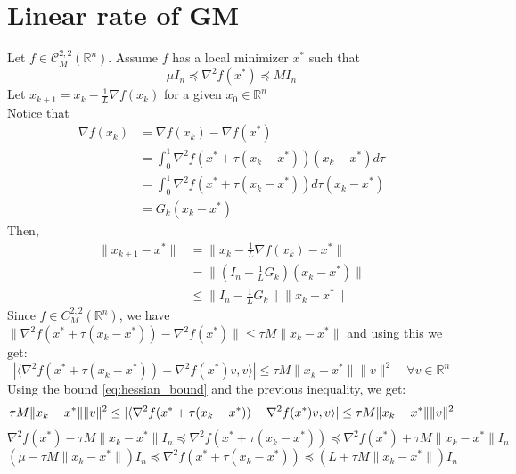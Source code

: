 \documentclass[12pt, openany]{report}
\newcommand{\R}{\mathbb{R}}
\newcommand{\C}{\mathcal{C}}
\theoremstyle{definition}
\begin{document}
\section{Linear rate of GM}
Let $f \in \C_M^{2,2}(\R^n)$. Assume $f$ has a local minimizer $x^*$ such that 
\begin{equation}\label{eq:hessian_bound}
	\mu I_n \preceq \nabla^2 f(x^*) \preceq MI_n
\end{equation}
Let $x_{k+1} = x_k - \frac{1}{L} \nabla f(x_k)$ for a given $x_0 \in \R^n$\\
Notice that
\begin{equation}\label{eq:G_k}
	\begin{aligned}
		\nabla f(x_k) &= \nabla f(x_k) - \nabla f(x^*)\\
		&= \int_{0}^{1} \nabla^2 f(x^* + \tau(x_k-x^*)) (x_k-x^*) d\tau\\
		&= \int_{0}^{1} \nabla^2 f(x^* + \tau(x_k-x^*)) d\tau (x_k-x^*) \\
		&= G_k (x_k-x^*)
	\end{aligned}
\end{equation}
Then,
\begin{equation}
	\begin{aligned}
		\|x_{k+1} - x^*\| &= \|x_k - \frac{1}{L} \nabla f(x_k) - x^*\|\\
		&= \|(I_n-\frac{1}{L}G_k)(x_k-x^*)\|\\
		&\leq \|I_n - \frac{1}{L}G_k\| \|x_k-x^*\|
	\end{aligned}
\end{equation}
Since $f \in C_M^{2,2}(\R^n)$, we have $\|\nabla^2f(x^*+\tau(x_k-x^*))-\nabla^2f(x^*)\| \leq \tau M \|x_k -x^*\|$ and using this we get:
\begin{equation}
	|\langle \nabla^2f(x^*+\tau(x_k-x^*))-\nabla^2f(x^*) v, v\rangle| \leq \tau M \|x_k -x^*\| \|v\|^2 \quad \forall v \in \R^n
\end{equation}
Using the bound \eqref{eq:hessian_bound} and the previous inequality, we get:
\begin{equation}
		\tau M \|x_k -x^*\| \|v\|^2 \leq |\langle \nabla^2f(x^*+\tau(x_k-x^*))-\nabla^2f(x^*) v, v\rangle| \leq \tau M \|x_k -x^*\| \|v\|^2\\
\end{equation}
\begin{equation}
	\nabla^2 f(x^*) - \tau M \|x_k -x^*\| I_n \preceq \nabla^2f(x^*+\tau(x_k-x^*)) \preceq \nabla^2 f(x^*) + \tau M \|x_k -x^*\|I_n 
\end{equation}
\begin{equation}
	(\mu - \tau M \|x_k -x^*\|)I_n \preceq \nabla^2f(x^*+\tau(x_k-x^*)) \preceq (L + \tau M \|x_k -x^*\|) I_n 
\end{equation}
\end{document}
